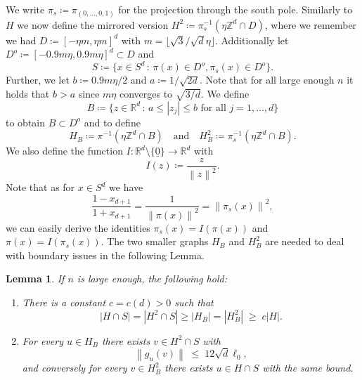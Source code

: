 \documentclass[11pt]{article}%
\newtheorem{lemma}[lemma]{Lemma}
\newcommand{\norm}[1]{\ensuremath{\left\|#1\right\|}}
\newcommand{\RR}{\mathbb{R}}
\newcommand{\ZZ}{\mathbb{Z}}
\newcommand{\typ}{\underline{0}}
\begin{document}
\noindent
We write $\pi_s\coloneqq\pi_{(0,\dots,0,1)}$ for the projection through the south pole. Similarly to $H$ we now define the mirrored version $H^2\coloneq \pi_s^{-1}(\eta \ZZ^d\cap D) $, where we remember we had $D\coloneqq [-\eta m, \eta m]^d$ with $m=\lfloor{{\sqrt{3}}/{\sqrt{d}\eta}}\rfloor$.
Additionally let $D^o \coloneq[-0.9 m\eta,0.9 m\eta ]^d \subset D$ and
\begin{equation*}
    S\coloneqq \{ x\in S^d\,:\, \pi(x)\in D^o, \pi_s(x)\in D^o \}.
\end{equation*}
Further, we let $b\coloneqq 0.9 m\eta/2$ and $a\coloneqq 1/\sqrt{2d}$. Note that for all large enough $n$ it holds that $b>a$ since $m\eta$ converges to $\sqrt{3/d}$. We define
    \begin{equation*}
        B\coloneqq \{z\in \RR^d\,:\, a\leq |z_j|\leq b \text{ for all }j=1,\dots,d\}
    \end{equation*}
    to obtain $B\subset D^o$ and to define  
    \begin{equation*}
        H_B\coloneqq\pi^{-1}(\eta\ZZ^d\cap B)\quad\text{and}\quad H_B^2\coloneqq\pi_s^{-1}(\eta\ZZ^d\cap B).
    \end{equation*}
We also define the function $I:\RR^ d\setminus\{\typ\}\to\RR^d$ with
\begin{equation*}
    I(z)\coloneq\frac{z}{\norm{z}^2}.
\end{equation*}
Note that as for $x\in S^d$ we have
\begin{equation*}
    \frac{1-x_{d+1}}{1+x_{d+1}}=\frac{1}{\norm{\pi(x)}^2}=\norm{\pi_s(x)}^2,
\end{equation*}
we can easily derive the identities $\pi_s(x)=I(\pi(x))$ and $\pi(x)=I(\pi_s(x))$. The two smaller graphs $H_B$ and $H_B^2$ are needed to deal with boundary issues in the following Lemma.


\begin{lemma}\label{halfpoints}
	If $n$ is large enough, the following hold:
	\begin{enumerate}[label=(\roman*)]
		\item  There is a constant $c=c(d)>0$ such that
		\begin{equation*}
		    |H\cap S| = |H^2\cap S|\geq  |H_B| = |H_B^2| \;\ge\;  c|H|.
		\end{equation*}
		\item 
		For every $u\in H_B$ there exists $v\in H^2\cap S$ with
		\begin{equation*}
		    \norm{g_u(v)}\;\le\; 12\sqrt{d}\ell_0,
		\end{equation*}
		and conversely for every $v\in H_B^2$ there exists $u\in H\cap S$ with the same bound.
	\end{enumerate}
\end{lemma}
\end{document}
